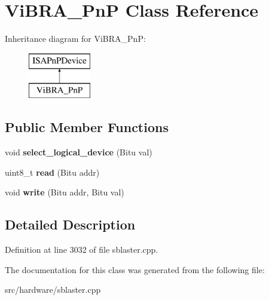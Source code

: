 \hypertarget{classViBRA__PnP}{\section{Vi\-B\-R\-A\-\_\-\-Pn\-P Class Reference}
\label{classViBRA__PnP}
}
Inheritance diagram for Vi\-B\-R\-A\-\_\-\-Pn\-P\-:\begin{figure}[H]
\begin{center}
\leavevmode
\includegraphics[height=2.000000cm]{classViBRA__PnP}
\end{center}
\end{figure}
\subsection*{Public Member Functions}
\begin{DoxyCompactItemize}
\item 
\hypertarget{classViBRA__PnP_ad5d0a168bbb86f72c44255c0b065ec1a}{void {\bfseries select\-\_\-logical\-\_\-device} (Bitu val)}\label{classViBRA__PnP_ad5d0a168bbb86f72c44255c0b065ec1a}

\item 
\hypertarget{classViBRA__PnP_ac467093f48f75b421715ebd10a676f05}{uint8\-\_\-t {\bfseries read} (Bitu addr)}\label{classViBRA__PnP_ac467093f48f75b421715ebd10a676f05}

\item 
\hypertarget{classViBRA__PnP_a9d6d3c3ad0a64c68a222f93ee3a30f31}{void {\bfseries write} (Bitu addr, Bitu val)}\label{classViBRA__PnP_a9d6d3c3ad0a64c68a222f93ee3a30f31}

\end{DoxyCompactItemize}


\subsection{Detailed Description}


Definition at line 3032 of file sblaster.\-cpp.



The documentation for this class was generated from the following file\-:\begin{DoxyCompactItemize}
\item 
src/hardware/sblaster.\-cpp\end{DoxyCompactItemize}
